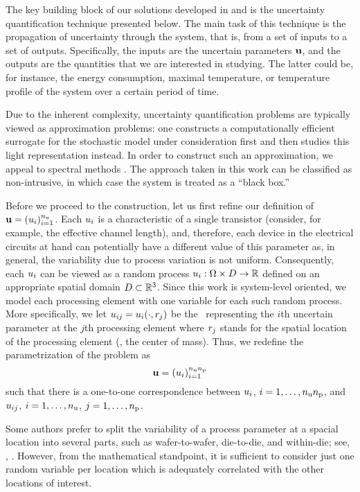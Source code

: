 The key building block of our solutions developed in  and  is the uncertainty quantification technique presented below.
The main task of this technique is the propagation of uncertainty through the system, that is, from a set of inputs to a set of outputs.
Specifically, the inputs are the uncertain parameters $\mathbf{u}$, and the outputs are the quantities that we are interested in studying.
The latter could be, for instance, the energy consumption, maximal temperature, or temperature profile of the system over a certain period of time.

Due to the inherent complexity, uncertainty quantification problems are typically viewed as approximation problems: one constructs a computationally efficient surrogate for the stochastic model under consideration first and then studies this light representation instead.
In order to construct such an approximation, we appeal to spectral methods \cite{maitre2010, janson1997, eldred2008}.
The approach taken in this work can be classified as non-intrusive, in which case the system is treated as a ``black box.''

Before we proceed to the construction, let us first refine our definition of $\mathbf{u} = (u_i)_{i = 1}^{n_\text{u}}$.
Each $u_i$ is a characteristic of a single transistor (consider, for example, the effective channel length), and, therefore, each device in the electrical circuits at hand can potentially have a different value of this parameter as, in general, the variability due to process variation is not uniform.
Consequently, each $u_i$ can be viewed as a random process $u_i: \Omega \times D \to \mathbb{R}$ defined on an appropriate spatial domain $D \subset \mathbb{R}^3$.
Since this work is system-level oriented, we model each processing element with one variable for each such random process.
More specifically, we let $u_{ij} = u_i(\cdot, r_j)$ be the \rv\ representing the $i$th uncertain parameter at the $j$th processing element where $r_j$ stands for the spatial location of the processing element (\eg, the center of mass).
Thus, we redefine the parametrization of the problem as
\begin{equation} \elab{uncertain-parameters}
  \vu = (\u_i)_{i = 1}^{\nparams \nprocs}
\end{equation}
such that there is a one-to-one correspondence between $u_i$, $i = 1, \dots, {n_\text{u}} {n_\text{p}}$, and $u_{ij}$, $i = 1, \dots, {n_\text{u}}$, $j = 1, \dots, {n_\text{p}}$.
\begin{remark}
Some authors prefer to split the variability of a process parameter at a spacial location into several parts, such as wafer-to-wafer, die-to-die, and within-die; see, \eg, \cite{juan2012}.
However, from the mathematical standpoint, it is sufficient to consider just one random variable per location which is adequately correlated with the other locations of interest.
\end{remark}

